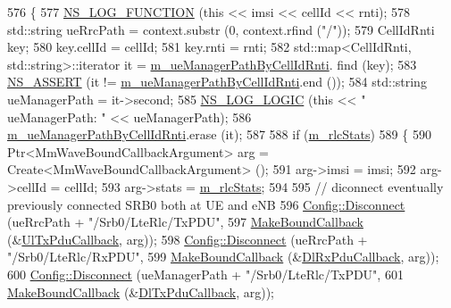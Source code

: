 \begin{DoxyCode}
576 \{
577   \hyperlink{log-macros-disabled_8h_a90b90d5bad1f39cb1b64923ea94c0761}{NS\_LOG\_FUNCTION} (\textcolor{keyword}{this} << imsi << cellId << rnti);
578   std::string ueRrcPath =  context.substr (0, context.rfind (\textcolor{stringliteral}{"/"}));
579   CellIdRnti key;
580   key.cellId = cellId;
581   key.rnti = rnti;
582   std::map<CellIdRnti, std::string>::iterator it = \hyperlink{classns3_1_1MmWaveBearerStatsConnector_a2e594f10e75a9fadbb3519a1dfc38081}{m\_ueManagerPathByCellIdRnti}.
      find (key);
583   \hyperlink{assert_8h_a6dccdb0de9b252f60088ce281c49d052}{NS\_ASSERT} (it != \hyperlink{classns3_1_1MmWaveBearerStatsConnector_a2e594f10e75a9fadbb3519a1dfc38081}{m\_ueManagerPathByCellIdRnti}.end ());
584   std::string ueManagerPath = it->second;  
585   \hyperlink{group__logging_ga88acd260151caf2db9c0fc84997f45ce}{NS\_LOG\_LOGIC} (\textcolor{keyword}{this} << \textcolor{stringliteral}{" ueManagerPath: "} << ueManagerPath);
586   \hyperlink{classns3_1_1MmWaveBearerStatsConnector_a2e594f10e75a9fadbb3519a1dfc38081}{m\_ueManagerPathByCellIdRnti}.erase (it);
587 
588   \textcolor{keywordflow}{if} (\hyperlink{classns3_1_1MmWaveBearerStatsConnector_a3613ebbbe92cd828e66b03c91c7ebcbb}{m\_rlcStats})
589     \{
590       Ptr<MmWaveBoundCallbackArgument> arg = Create<MmWaveBoundCallbackArgument> ();
591       arg->imsi = imsi;
592       arg->cellId = cellId; 
593       arg->stats = \hyperlink{classns3_1_1MmWaveBearerStatsConnector_a3613ebbbe92cd828e66b03c91c7ebcbb}{m\_rlcStats};
594 
595       \textcolor{comment}{// diconnect eventually previously connected SRB0 both at UE and eNB}
596       \hyperlink{group__config_ga33e975bd2ed84e3353b2a3356d90fc1d}{Config::Disconnect} (ueRrcPath + \textcolor{stringliteral}{"/Srb0/LteRlc/TxPDU"},
597                           \hyperlink{group__makeboundcallback_ga1725d6362e6065faa0709f7c93f8d770}{MakeBoundCallback} (&\hyperlink{namespacens3_ae624428f0992ac62a3c5f2e7318fb98e}{UlTxPduCallback}, arg));
598       \hyperlink{group__config_ga33e975bd2ed84e3353b2a3356d90fc1d}{Config::Disconnect} (ueRrcPath + \textcolor{stringliteral}{"/Srb0/LteRlc/RxPDU"},
599                           \hyperlink{group__makeboundcallback_ga1725d6362e6065faa0709f7c93f8d770}{MakeBoundCallback} (&\hyperlink{namespacens3_ae4fb5123d8a56fce742428b530ec4197}{DlRxPduCallback}, arg));
600       \hyperlink{group__config_ga33e975bd2ed84e3353b2a3356d90fc1d}{Config::Disconnect} (ueManagerPath + \textcolor{stringliteral}{"/Srb0/LteRlc/TxPDU"},
601                           \hyperlink{group__makeboundcallback_ga1725d6362e6065faa0709f7c93f8d770}{MakeBoundCallback} (&\hyperlink{namespacens3_a7de82f7ed9986b9bcb67951f61e02ff4}{DlTxPduCallback}, arg));

\end{DoxyCode}
